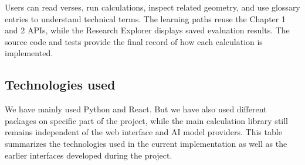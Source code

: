 \documentclass[12pt,a4paper,oneside]{report}
\begin{document}
Users can read verses, run calculations, inspect related geometry, and use glossary entries to understand technical terms. The learning paths reuse the Chapter 1 and 2 APIs, while the Research Explorer displays saved evaluation results. The source code and tests provide the final record of how each calculation is implemented.

\subsection{Technologies used}
\label{sec:technologies}

We have mainly used Python and React. But we have also used different packages on specific part of the project, while the main calculation library still remains independent of the web interface and AI model providers. This table summarizes the technologies used in the current implementation as well as the earlier interfaces developed during the project.
\end{document}
